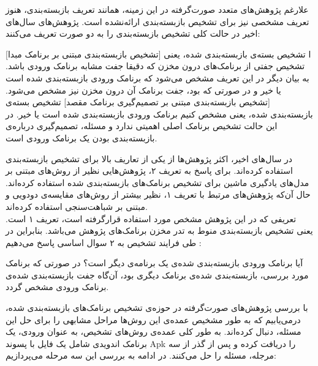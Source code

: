 علارغم پژوهش‌های متعدد صورت‌گرفته در این زمینه، همانند تعریف بازبسته‌بندی، هنوز تعریف مشخصی نیز برای تشخیص بازبسته‌بندی ارائه‌نشده‌ است. پژوهش‌های سال‌های اخیر در حالت کلی تشخیص بازبسته‌بندی را به دو صورت تعریف می‌کنند:‌



[تشخیص بازبسته‌بندی مبتنی بر برنامک مبدا]
ا\label{tarif1} تشخیص بسته‌ی بازبسته‌بندی شده، یعنی تشخیص جفتی از برنامک‌های درون مخزن که دقیقا جفت مشابه برنامک ورودی باشد. به بیان دیگر در این تعریف مشخص می‌شود که برنامک ورودی بازبسته‌بندی شده است یا خیر و در صورتی که بود، جفت برنامک آن درون مخزن نیز مشخص می‌شود.
[تشخیص بازبسته‌بندی مبتنی بر تصمیم‌گیری برنامک مقصد]
\label{tarif2} تشخیص بسته‌ی بازبسته‌بندی شده، یعنی مشخص کنیم برنامک ورودی بازبسته‌بندی شده است یا خیر. در این حالت تشخیص برنامک اصلی اهمیتی ندارد و مسئله، تصمیم‌گیری درباره‌ی بازبسته‌بندی بودن یک برنامک ورودی است.






در سال‌های اخیر، اکثر پژوهش‌ها از یکی از تعاریف بالا برای تشخیص بازبسته‌بندی استفاده کرده‌اند. برای پاسخ به تعریف ۲، پژوهش‌هایی نظیر  از روش‌های مبتنی بر مدل‌های یادگیری ماشین برای تشخیص برنامک‌های بازبسته‌‌بندی شده استفاده کرده‌اند. حال آن‌که پژوهش‌های مرتبط با تعریف ۱، نظیر   بیشتر از روش‌های مقایسه‌ی دودویی و مبتنی بر شباهت‌سنجی استفاده کرده‌اند. \\
تعریفی که در این پژوهش مشخص مورد استفاده قرار‌گرفته‌ است، تعریف ۱ است. یعنی تشخیص بازبسته‌بندی منوط به تدر مخزن برنامک‌های پژوهش می‌باشد. بنابراین در طی فرایند تشخیص به ۲ سوال اساسی پاسخ می‌دهیم :‌

 آیا برنامک ورودی بازبسته‌بندی شده‌ی یک برنامه‌ی دیگر است؟‌
 در صورتی که برنامک مورد بررسی، بازبسته‌بندی شده‌ی برنامک دیگری بود، آن‌گاه جفت بازبسته‌بندی شده‌ی برنامک ورودی مشخص گردد.


با بررسی پژوهش‌های صورت‌گرفته در حوزه‌ی تشخیص برنامک‌های بازبسته‌بندی شده، درمی‌یابیم که به طور مشخیص عمده‌ی این روش‌ها مراحل مشابهی را برای حل این مسئله، دنبال کرده‌اند. به طور کلی عمده‌ی روش‌های تشخیص، به عنوان ورودی، یک برنامک اندویدی شامل یک فایل با پسوند Apk را دریافت کرده و پس از گذر از سه مرجله، مسئله را حل می‌کنند. در ادامه به بررسی این سه مرحله می‌پردازیم:‌


